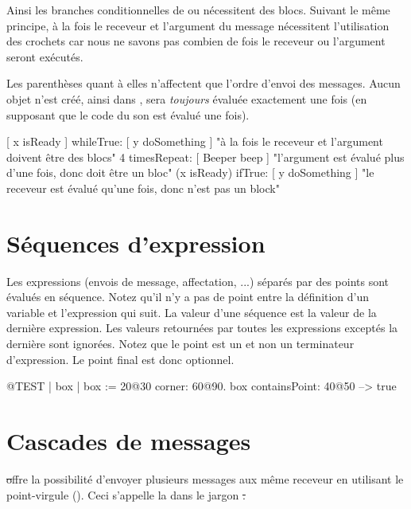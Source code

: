 \documentclass[a4paper,10pt,twoside]{book}
\begin{document}
Ainsi les branches conditionnelles de  ou  n\'ecessitent des blocs. Suivant le m\^eme principe, \`a la fois le receveur et l'argument du message  n\'ecessitent l'utilisation des crochets car nous ne savons pas combien de fois le receveur ou l'argument seront ex\'ecut\'es.

Les parenth\`eses quant \`a elles n'affectent que l'ordre d'envoi des messages.
Aucun objet n'est cr\'e\'e, ainsi dans ,  sera \emph{toujours} \'evalu\'ee exactement une fois (en supposant que le code du son est \'evalu\'e une fois).

\begin{code}{}
[ x isReady ] whileTrue: [ y doSomething ]   "\`a la fois le receveur et l'argument doivent \^etre des blocs"
4 timesRepeat: [ Beeper beep ]                   "l'argument est \'evalu\'e plus d'une fois, donc doit \^etre un bloc"
(x isReady) ifTrue: [ y doSomething ]           "le receveur est \'evalu\'e qu'une fois, donc n'est pas un block"
\end{code}

\section{S\'equences d'expression}
Les expressions (\ie envois de message, affectation, ...) s\'epar\'es par des points sont \'evalu\'es en s\'equence.
Notez qu'il n'y a pas de point entre la d\'efinition d'un variable et l'expression qui suit.
La valeur d'une s\'equence est la valeur de la derni\`ere expression. Les valeurs retourn\'ees par toutes les expressions except\'es la derni\`ere sont ignor\'ees. Notez que le point est un  et non un terminateur d'expression. Le point final est donc optionnel.

\begin{code}{@TEST}
| box |
box := 20@30 corner: 60@90.
box containsPoint: 40@50 --> true
\end{code}

\section{Cascades de messages}
\st offre la possibilit\'e d'envoyer plusieurs messages aux m\^eme receveur en utilisant le point-virgule (\ct{\;}). Ceci s'appelle la  dans le jargon \st.
\end{document}
